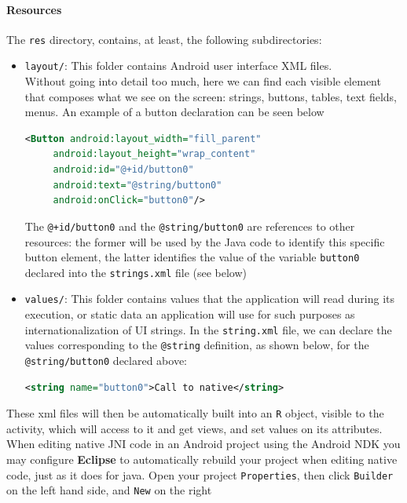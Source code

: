 \documentclass[a4paper,10pt]{article}
\newcommand{\keyword}[1]{\texttt{#1}}
\begin{document}
\begin{multicols}{2}
\paragraph{Resources}
The \keyword{res} directory, contains, at least, the following subdirectories:
\begin{itemize}
\item \keyword{layout/}: This folder contains Android user interface XML files.
\\Without going into detail too much, here we can find each visible element that
composes what we see on the screen: strings, buttons, tables, text fields, menus.
An example of a button declaration can be seen below
\begin{lstlisting}[language=XML,
		   columns=fullflexible,
		   showstringspaces=false,
		   commentstyle=\color{gray}\upshape]
<Button android:layout_width="fill_parent"
	 android:layout_height="wrap_content"
	 android:id="@+id/button0"
	 android:text="@string/button0"
	 android:onClick="button0"/>
\end{lstlisting}
The \keyword{@+id/button0} and the \keyword{@string/button0} are references to
other resources: the former will be used by the Java code to identify this
specific button element, the latter identifies the value of the variable
\keyword{button0} declared into the \keyword{strings.xml} file (see below)
\item \keyword{values/}: This folder contains values that the application will
read during its execution, or static data an application will use for such
purposes as internationalization of UI strings. In the \keyword{string.xml}
file, we can declare the values corresponding to the \keyword{@string}
definition, as shown below, for the \keyword{@string/button0} declared above:
\begin{lstlisting}[language=XML,
		   columns=fullflexible,
		   showstringspaces=false,
		   commentstyle=\color{gray}\upshape]
<string name="button0">Call to native</string>
\end{lstlisting}
\end{itemize}
These xml files will then be automatically built into an \keyword{R} object,
visible to the activity, which will access to it and get views, and set values
on its attributes.\\
When editing native JNI code in an Android project using the Android NDK you may
configure \textbf{Eclipse} to automatically rebuild your project when editing
native code, just as it does for java. Open your project \texttt{Properties},
then click \texttt{Builder} on the left hand side, and \texttt{New} on the right

\end{multicols}
\end{document}
